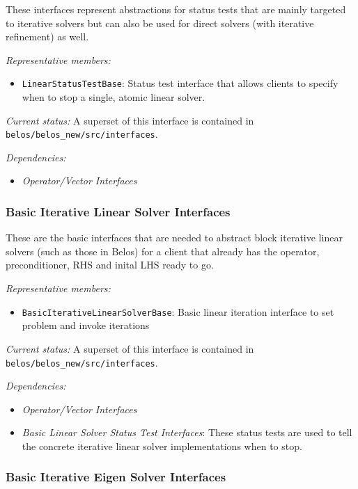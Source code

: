 \documentclass[pdf,ps2pdf,11pt]{SANDreport}
\begin{document}
These interfaces represent abstractions for status tests that are mainly
targeted to iterative solvers but can also be used for direct solvers (with
iterative refinement) as well.

{}\textit{Representative members:}
\begin{itemize}
%
{}\item {}\texttt{LinearStatusTestBase}: Status test interface that allows clients
to specify when to stop a single, atomic linear solver.
%
\end{itemize}

{}\textit{Current status:} A superset of this interface is contained in
{}\texttt{belos/belos\_new/src/interfaces}.

{}\textit{Dependencies:}
\begin{itemize}
\item {}\textit{Operator/Vector Interfaces}
\end{itemize}

%
\subsubsection{Basic Iterative Linear Solver Interfaces}
%

These are the basic interfaces that are needed to abstract block iterative
linear solvers (such as those in Belos) for a client that already has the
operator, preconditioner, RHS and inital LHS ready to go.

{}\textit{Representative members:}
\begin{itemize}
%
{}\item {}\texttt{BasicIterativeLinearSolverBase}: Basic linear iteration
interface to set problem and invoke iterations
%
\end{itemize}

{}\textit{Current status:} A superset of this interface is contained in
{}\texttt{belos/belos\_new/src/interfaces}.

{}\textit{Dependencies:}
\begin{itemize}
%
{}\item {}\textit{Operator/Vector Interfaces}
%
{}\item {}\textit{Basic Linear Solver Status Test Interfaces}: These status
tests are used to tell the concrete iterative linear solver implementations
when to stop.
%
\end{itemize}

%
\subsubsection{Basic Iterative Eigen Solver Interfaces}
%
\end{document}
